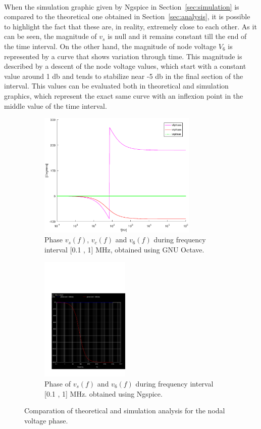 \paragraph{}
When the simulation graphic given by Ngspice in Section~\ref{sec:simulation} is compared to the theoretical one obtained in Section~\ref{sec:analysis}, it is possible to highlight the fact that these are, in reality, extremely close to each other. As it can be seen, the magnitude of $v_s$ is null and it remains constant till the end of the time interval. On the other hand, the magnitude of node voltage $V_6$ is represented by a curve that shows variation through time. This magnitude is described by a descent of the node voltage values, which start with a constant value around 1 db and tends to stabilize near -5 db in the final section of the interval. This values can be evaluated both in theoretical and simulation graphics, which represent the exact same curve with an inflexion point in the middle value of the time interval.


\begin{figure}[H]

\begin{subfigure}{0.5\textwidth}
\includegraphics[width=0.9\linewidth, height=6cm]{phase.eps} 
\caption{Phase $v_s(f)$,  $v_c(f)$  and $v_6(f)$ during frequency interval [0.1 , 1] MHz, obtained using GNU Octave.}
\label{fig:theo_third}
\end{subfigure}
\begin{subfigure}{0.5\textwidth}
\includegraphics[width=0.9\linewidth, height=6cm]{acp.pdf}
\caption{Phase of $v_s(f)$ and $v_6(f)$ during frequency interval [0.1 , 1] MHz. obtained using Ngspice.}
\label{fig:total}
\end{subfigure}

\caption{Comparation of theoretical and simulation analysis for the nodal voltage phase.}
\label{fig:compar_4}
\end{figure}

